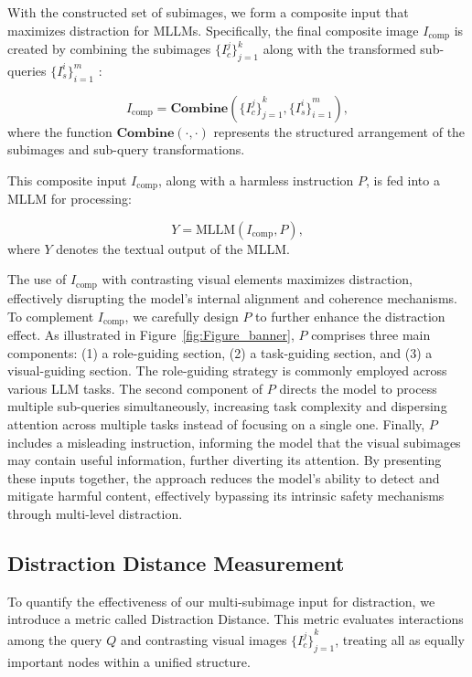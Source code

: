 With the constructed set of subimages, we form a composite input that maximizes distraction for MLLMs. Specifically, the final composite image  $I_{\text{comp}}$  is created by combining the subimages  $\{I_c^j\}_{j=1}^k$  along with the transformed sub-queries  $\{I_s^i\}_{i=1}^{m}$ :

\begin{equation}
I_{\text{comp}} = \textbf{Combine}\left({\{I_c^j\}}_{j=1}^k, {\{I_s^i\}}_{i=1}^{m}\right),
\end{equation}
where the function $\textbf{Combine}(\cdot,\cdot)$ represents the structured arrangement of the subimages and sub-query transformations.

This composite input $I_{\text{comp}}$, along with a harmless instruction $P$, is fed into a MLLM for processing:

\begin{equation}
Y = \text{MLLM}(I_{\text{comp}}, P),
\end{equation}
where $Y$ denotes the textual output of the MLLM.


The use of $I_{\text{comp}}$ with contrasting visual elements maximizes distraction, effectively disrupting the model’s internal alignment and coherence mechanisms. To complement $I_{\text{comp}}$, we carefully design $P$ to further enhance the distraction effect. As illustrated in Figure~\ref{fig:Figure_banner}, $P$ comprises three main components: (1) a role-guiding section, (2) a task-guiding section, and (3) a visual-guiding section. The role-guiding strategy is commonly employed across various LLM tasks. The second component of $P$ directs the model to process multiple sub-queries simultaneously, increasing task complexity and dispersing attention across multiple tasks instead of focusing on a single one. Finally, $P$ includes a misleading instruction, informing the model that the visual subimages may contain useful information, further diverting its attention. By presenting these inputs together, the approach reduces the model’s ability to detect and mitigate harmful content, effectively bypassing its intrinsic safety mechanisms through multi-level distraction.


\subsection{Distraction Distance Measurement}
To quantify the effectiveness of our multi-subimage input for distraction, we introduce a metric called Distraction Distance. This metric evaluates interactions among the query $Q$ and contrasting visual images ${\{I_c^j\}}_{j=1}^k$, treating all as equally important nodes within a unified structure.

